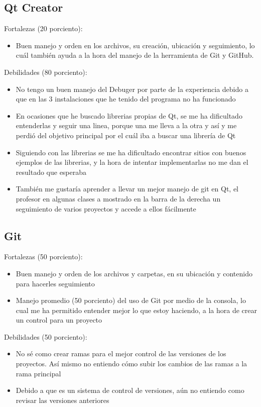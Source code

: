 \documentclass{article}
\begin{document}
\subsection{Qt Creator}
Fortalezas (20 porciento): 
{
\begin{itemize}
\item{Buen manejo y orden en los archivos, su creación, ubicación y seguimiento, lo cuál también ayuda a la hora del manejo de la herramienta de Git y GitHub.}
\end{itemize}
}

Debilidades (80 porciento):
{
\begin{itemize}
\item{No tengo un buen manejo del Debuger por parte de la experiencia debido a que en las 3 instalaciones que he tenido del programa no ha funcionado}
\item{En ocasiones que he buscado librerias propias de Qt, se me ha dificultado entenderlas y seguir una linea, porque una me lleva a la otra y así y me perdió del objetivo principal por el cuál iba a buscar una librería de Qt}
\item{Siguiendo con las librerias se me ha dificultado encontrar sitios con buenos ejemplos de las librerias, y la hora de intentar implementarlas no me dan el resultado que esperaba}
\item{También me gustaría aprender a llevar un mejor manejo de git en Qt, el profesor en algunas clases a mostrado en la barra de la derecha un seguimiento de varios proyectos y accede a ellos fácilmente}

\end{itemize}
}

\subsection{Git}
Fortalezas (50 porciento):
{
\begin{itemize}
\item{Buen manejo y orden de los archivos y carpetas, en su ubicación y contenido para hacerles seguimiento}
\item{Manejo promedio (50 porciento) del uso de Git por medio de la consola, lo cual me ha permitido entender mejor lo que estoy haciendo, a la hora de crear un control para un proyecto }
\end{itemize}
}
Debilidades (50 porciento):
{
\begin{itemize}
\item{No sé como crear ramas para el mejor control de las versiones de los proyectos. Así mismo no entiendo cómo subir los cambios de las ramas a la rama principal}
\item{Debido a que es un sistema de control de versiones, aún no entiendo como revisar las versiones anteriores}

\end{itemize}
}
\end{document}
